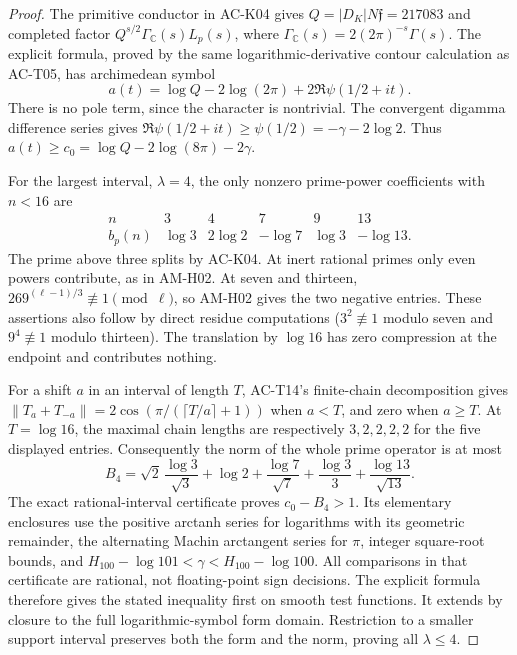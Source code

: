 \begin{proof}
The primitive conductor in AC-K04 gives
$Q=|D_K|N\mathfrak f=217083$ and completed factor
$Q^{s/2}\Gamma_{\mathbb C}(s)L_p(s)$, where
$\Gamma_{\mathbb C}(s)=2(2\pi)^{-s}\Gamma(s)$.
The explicit formula, proved by the same logarithmic-derivative
contour calculation as AC-T05, has archimedean symbol
\[
 a(t)=\log Q-2\log(2\pi)+2\Re\psi(1/2+it).
\]
There is no pole term, since the character is nontrivial.
The convergent digamma difference series gives
$\Re\psi(1/2+it)\ge\psi(1/2)=-\gamma-2\log2$.
Thus $a(t)\ge c_0=\log Q-2\log(8\pi)-2\gamma$.

For the largest interval, $\lambda=4$, the only nonzero
prime-power coefficients with $n<16$ are
\[
\begin{array}{c|ccccc}
n&3&4&7&9&13\\ \hline
b_p(n)&\log3&2\log2&-\log7&\log3&-\log13.
\end{array}
\]
The prime above three splits by AC-K04. At inert rational
primes only even powers contribute, as in AM-H02. At seven
and thirteen, $269^{(\ell-1)/3}\not\equiv1\pmod\ell$, so
AM-H02 gives the two negative entries. These assertions
also follow by direct residue computations ($3^2\not\equiv1$
modulo seven and $9^4\not\equiv1$ modulo thirteen).
The translation by $\log16$ has zero compression at the
endpoint and contributes nothing.

For a shift $a$ in an interval of length $T$, AC-T14's
finite-chain decomposition gives
$\|T_a+T_{-a}\|=2\cos(\pi/(\lceil T/a\rceil+1))$
when $a<T$, and zero when $a\ge T$. At $T=\log16$, the
maximal chain lengths are respectively $3,2,2,2,2$ for
the five displayed entries. Consequently the norm of the
whole prime operator is at most
\[
 B_4=\sqrt2\,\frac{\log3}{\sqrt3}+\log2
       +\frac{\log7}{\sqrt7}+\frac{\log3}{3}
       +\frac{\log13}{\sqrt{13}}.
\]
The exact rational-interval certificate
 proves $c_0-B_4>1$.
Its elementary enclosures use the positive arctanh series
for logarithms with its geometric remainder, the alternating
Machin arctangent series for $\pi$, integer square-root
bounds, and $H_{100}-\log101<\gamma<H_{100}-\log100$.
All comparisons in that certificate are rational, not
floating-point sign decisions. The explicit formula therefore
gives the stated inequality first on smooth test functions.
It extends by closure to the full logarithmic-symbol form
domain. Restriction to a smaller support interval preserves
both the form and the norm, proving all $\lambda\le4$.
\end{proof}

